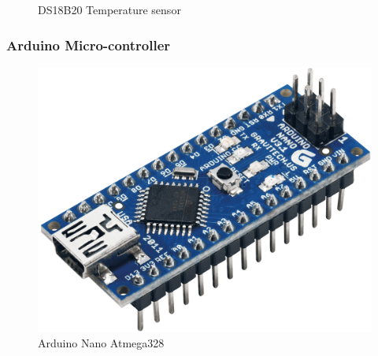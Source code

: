 \documentclass[10pt]{beamer}
\begin{document}
{{\begin{frame}
\begin{figure}[h!]
			\caption{DS18B20 Temperature sensor}
		\end{figure}
	\end{frame}
}
{
	\begin{frame}
		\frametitle{Arduino Micro-controller}
		\begin{figure}[h!]
				\includegraphics[scale=0.1]{images/arduino_nano}
				\caption{Arduino Nano Atmega328}
		\end{figure}
	\end{frame}
}

}
\end{document}
